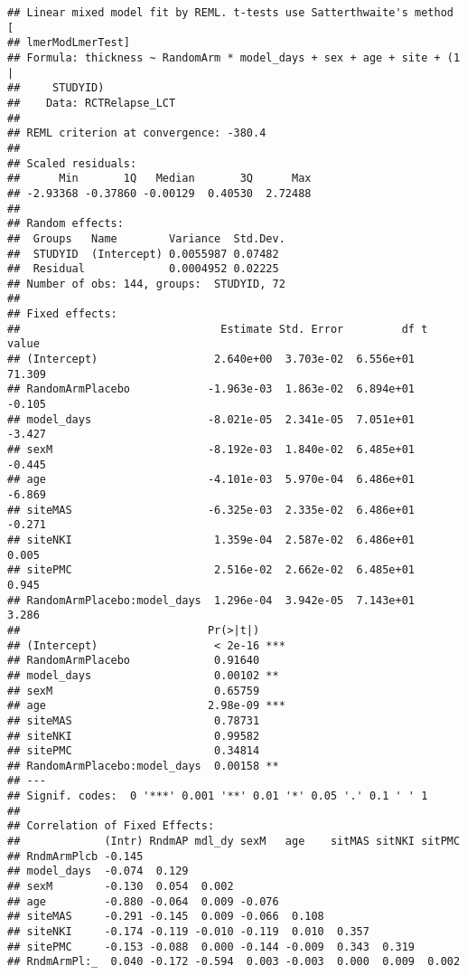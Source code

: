 \documentclass[]{article}
\theoremstyle{definition}
\theoremstyle{definition}
\theoremstyle{definition}
\theoremstyle{remark}
\begin{document}
\begin{verbatim}
## Linear mixed model fit by REML. t-tests use Satterthwaite's method [
## lmerModLmerTest]
## Formula: thickness ~ RandomArm * model_days + sex + age + site + (1 |  
##     STUDYID)
##    Data: RCTRelapse_LCT
## 
## REML criterion at convergence: -380.4
## 
## Scaled residuals: 
##      Min       1Q   Median       3Q      Max 
## -2.93368 -0.37860 -0.00129  0.40530  2.72488 
## 
## Random effects:
##  Groups   Name        Variance  Std.Dev.
##  STUDYID  (Intercept) 0.0055987 0.07482 
##  Residual             0.0004952 0.02225 
## Number of obs: 144, groups:  STUDYID, 72
## 
## Fixed effects:
##                               Estimate Std. Error         df t value
## (Intercept)                  2.640e+00  3.703e-02  6.556e+01  71.309
## RandomArmPlacebo            -1.963e-03  1.863e-02  6.894e+01  -0.105
## model_days                  -8.021e-05  2.341e-05  7.051e+01  -3.427
## sexM                        -8.192e-03  1.840e-02  6.485e+01  -0.445
## age                         -4.101e-03  5.970e-04  6.486e+01  -6.869
## siteMAS                     -6.325e-03  2.335e-02  6.486e+01  -0.271
## siteNKI                      1.359e-04  2.587e-02  6.486e+01   0.005
## sitePMC                      2.516e-02  2.662e-02  6.485e+01   0.945
## RandomArmPlacebo:model_days  1.296e-04  3.942e-05  7.143e+01   3.286
##                             Pr(>|t|)    
## (Intercept)                  < 2e-16 ***
## RandomArmPlacebo             0.91640    
## model_days                   0.00102 ** 
## sexM                         0.65759    
## age                         2.98e-09 ***
## siteMAS                      0.78731    
## siteNKI                      0.99582    
## sitePMC                      0.34814    
## RandomArmPlacebo:model_days  0.00158 ** 
## ---
## Signif. codes:  0 '***' 0.001 '**' 0.01 '*' 0.05 '.' 0.1 ' ' 1
## 
## Correlation of Fixed Effects:
##             (Intr) RndmAP mdl_dy sexM   age    sitMAS sitNKI sitPMC
## RndmArmPlcb -0.145                                                 
## model_days  -0.074  0.129                                          
## sexM        -0.130  0.054  0.002                                   
## age         -0.880 -0.064  0.009 -0.076                            
## siteMAS     -0.291 -0.145  0.009 -0.066  0.108                     
## siteNKI     -0.174 -0.119 -0.010 -0.119  0.010  0.357              
## sitePMC     -0.153 -0.088  0.000 -0.144 -0.009  0.343  0.319       
## RndmArmPl:_  0.040 -0.172 -0.594  0.003 -0.003  0.000  0.009  0.002
\end{verbatim}
\end{document}
